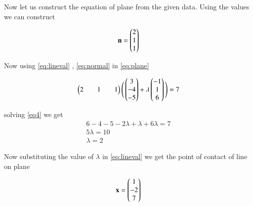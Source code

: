 \documentclass[journal,12pt,twocolumn]{IEEEtran}
\begin{document}
Now let us construct the equation of plane from the given data.
Using the values we can construct 

\begin{align}
\mathbf{n}=\begin{pmatrix} 2\\ 1\\1\end{pmatrix}\label{eq:normal}
\end{align}


Now using \eqref{eq:lineval} , \eqref{eq:normal}   in \eqref{eq:plane}

\begin{align}
\begin{pmatrix} 2 && 1 && 1\end{pmatrix} \Bigg( \begin{pmatrix}3 \\-4 \\-5\end{pmatrix}+\lambda\begin{pmatrix}-1 \\1 \\6\end{pmatrix} \Bigg)=7\label{eq4}
\end{align}

solving \eqref{eq4} we get 
\begin{align}  
6 -4 -5-2\lambda+ \lambda+ 6 \lambda=7 \\ 
5 \lambda=10 \\
\lambda=2 \label{eq5} 
\end{align}

Now substituting the value of $\lambda$ in \eqref{eq:lineval} we get the point of contact of line on plane


\begin{align}
\mathbf{x}=\begin{pmatrix}1\\-2\\7 \end{pmatrix}
\end{align}
\pagebreak
\end{document}
